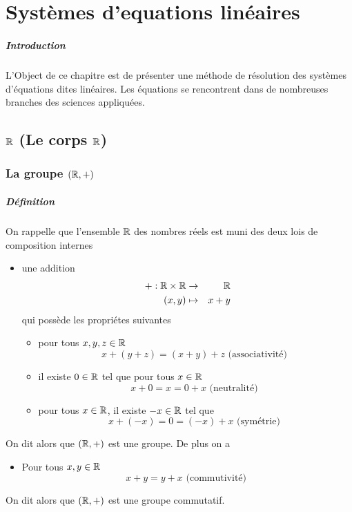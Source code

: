 \chapter{Systèmes d'equations linéaires}

\paragraph{Introduction} L'Object de ce chapitre est de présenter une méthode de résolution des systèmes d'équations dites linéaires. Les équations se rencontrent dans de nombreuses branches des sciences appliquées.
%
%
\section{$\mathbb{R}$ (Le corps $\mathbb{R}$)}
%
%
%
\subsection{La groupe $(\mathbb{R}, +)$}
%
\paragraph{Définition} On rappelle que l'ensemble $\mathbb{R}$ des nombres réels est muni des deux lois de composition internes
\begin{itemize}
  \item une addition 
    \begin{eqnarray*}
      +: \mathbb{R} \times \mathbb{R} &\rightarrow& \mathbb{R} \\
      (x, y) &\mapsto& x+y
    \end{eqnarray*}
    qui possède les propriétes suivantes
    \begin{itemize}
      \item pour tous $x, y, z \in \mathbb{R}$
        $$x + (y + z) = (x + y) + z \text{ (associativité) }$$
      \item il existe $0 \in \mathbb{R}$ tel que pour tous $x \in \mathbb{R}$
        $$x + 0 = x = 0 + x \text{ (neutralité) }$$
      \item pour tous $x \in \mathbb{R}$, il existe $-x \in \mathbb{R}$ tel que
        $$x + (-x) = 0 = (-x) + x \text{ (symétrie) }$$
    \end{itemize}
\end{itemize}
On dit alors que $(\mathbb{R}, +)$ est une groupe. De plus on a
\begin{itemize}
  \item Pour tous $x, y \in \mathbb{R}$
    $$x + y = y + x \text{ (commutivité) }$$
\end{itemize}
On dit alors que $(\mathbb{R}, +)$ est une groupe commutatif.

